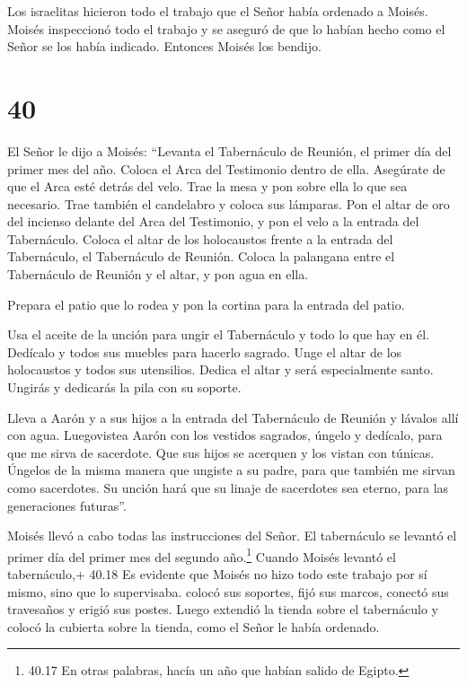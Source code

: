  Los israelitas hicieron todo el trabajo que el Señor había
ordenado a Moisés.  Moisés inspeccionó todo el trabajo y se
aseguró de que lo habían hecho como el Señor se los había indicado.
Entonces Moisés los bendijo.

\hypertarget{section-39}{%
\section{40}\label{section-39}}

 El Señor le dijo a Moisés:  ``Levanta el
Tabernáculo de Reunión, el primer día del primer mes del año.
 Coloca el Arca del Testimonio dentro de ella. Asegúrate de
que el Arca esté detrás del velo.  Trae la mesa y pon sobre
ella lo que sea necesario. Trae también el candelabro y coloca sus
lámparas.  Pon el altar de oro del incienso delante del Arca
del Testimonio, y pon el velo a la entrada del Tabernáculo. 
Coloca el altar de los holocaustos frente a la entrada del Tabernáculo,
el Tabernáculo de Reunión.  Coloca la palangana entre el
Tabernáculo de Reunión y el altar, y pon agua en ella.

 Prepara el patio que lo rodea y pon la cortina para la
entrada del patio.

 Usa el aceite de la unción para ungir el Tabernáculo y todo
lo que hay en él. Dedícalo y todos sus muebles para hacerlo sagrado.
 Unge el altar de los holocaustos y todos sus utensilios.
Dedica el altar y será especialmente santo.  Ungirás y
dedicarás la pila con su soporte.

 Lleva a Aarón y a sus hijos a la entrada del Tabernáculo
de Reunión y lávalos allí con agua.  Luegovistea Aarón con
los vestidos sagrados, úngelo y dedícalo, para que me sirva de
sacerdote.  Que sus hijos se acerquen y los vistan con
túnicas.  Úngelos de la misma manera que ungiste a su
padre, para que también me sirvan como sacerdotes. Su unción hará que su
linaje de sacerdotes sea eterno, para las generaciones futuras''.

 Moisés llevó a cabo todas las instrucciones del Señor.
 El tabernáculo se levantó el primer día del primer mes del
segundo año.\footnote{40.17 En otras palabras, hacía un año que habían
  salido de Egipto.}  Cuando Moisés levantó el
tabernáculo,+ 40.18 Es evidente que Moisés no hizo todo este trabajo por
sí mismo, sino que lo supervisaba. colocó sus soportes, fijó sus marcos,
conectó sus travesaños y erigió sus postes.  Luego extendió
la tienda sobre el tabernáculo y colocó la cubierta sobre la tienda,
como el Señor le había ordenado.

